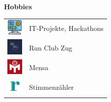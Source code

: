 \documentclass[aspectratio=169]{beamer}
\begin{document}
\begin{frame}[t]
\begin{columns}[T,onlytextwidth]
        \begin{column}{0.5\textwidth}
            \textbf{Hobbies}\\[0.3cm]
            \begin{tabular}{@{}m{0.9cm} m{5cm}@{}}
                \includegraphics[width=0.8cm]{images/logo_computer.png} & IT-Projekte, Hackathons \\
                \includegraphics[width=0.8cm]{images/logo_run_club.jpg} & Run Club Zug \\
                \includegraphics[width=0.8cm]{images/logo_mensa_switzerland.jpg} & Mensa \\
                \includegraphics[width=0.8cm]{images/logo_gemeinde_risch.jpg} & Stimmenzähler \\
            \end{tabular}
        \end{column}
    \end{columns}
\end{frame}
\end{document}
